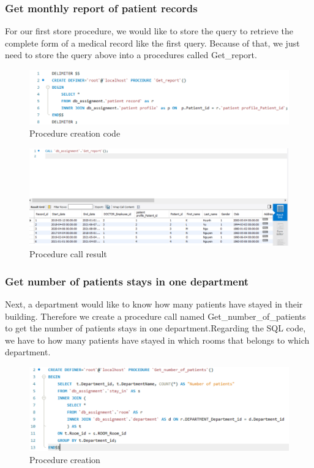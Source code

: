\subsubsection{Get monthly report of patient records}
For our first store procedure, we would like to store the query to retrieve the complete form of a medical record like the first query. Because of that, we just need to store the query above into a procedures called Get\_report.

\begin{figure}[H]
    \centering
    \includegraphics[width = 12cm]{assets/procedure_1a.png}
    \captionsetup{justification=centering,margin=2cm}
    \caption{Procedure creation code}
\end{figure}

\begin{figure}[H]
    \centering
    \includegraphics[width = 12cm]{assets/procedure_1b.png}
    \captionsetup{justification=centering,margin=2cm}
    \caption{Procedure call result}
\end{figure}

\subsubsection{Get number of patients stays in one department}

Next, a department would like to know how many patients have stayed in their building. Therefore we create a procedure call named Get\_number\_of\_patients to get the number of patients stays in one department.Regarding the SQL code, we have to how many patients have stayed in which rooms that belongs to which department.

\begin{figure}[H]
    \centering
    \includegraphics[width = 12cm]{assets/procedure_2a.png}
    \captionsetup{justification=centering,margin=2cm}
    \caption{Procedure creation}
\end{figure}

